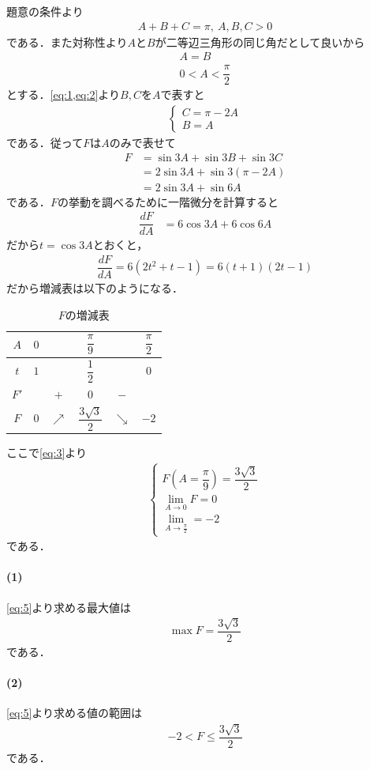 \documentclass[../../main.tex]{subfiles}
\begin{document}
題意の条件より
\begin{align}
  A+B+C=\pi,\ A,B,C>0 \label{eq:1}
\end{align}
である．また対称性より$A$と$B$が二等辺三角形の同じ角だとして良いから
\begin{align}
  A=B \label{eq:2} \\
  0<A<\dfrac{\pi}{2}
\end{align}
とする．\cref{eq:1,eq:2}より$B,C$を$A$で表すと
\begin{align}
  \begin{cases}
    C = \pi -2A \\
    B = A
  \end{cases}
\end{align}
である．従って$F$は$A$のみで表せて
\begin{align}
  F
  &=\sin3A+\sin3B+\sin3C \\
  &=2\sin3A+\sin 3(\pi-2A) \\
  &=2\sin3A+\sin6A \label{eq:3}
\end{align}
である．$F$の挙動を調べるために一階微分を計算すると
\begin{align}
  \dfrac{dF}{dA}&=6\cos3A+6\cos6A \label{eq:4}
\end{align}
だから$t=\cos3A$とおくと，
\begin{align}
  \dfrac{dF}{dA} = 6\left(2t^2+t-1\right) = 6(t+1)(2t-1)
\end{align}
だから増減表は以下のようになる．

\begin{table}[htb]
  \begin{center}
    \caption{$F$の増減表}
    \begin{tabular}{c|ccccc}
      $A$ & $0$ & & $\dfrac{\pi}{9}$ & & $\dfrac{\pi}{2}$ \\
      \hline
      $t$ & $1$ & & $\dfrac{1}{2}$ & & $0$ \\
      \hline
      $F'$ & & $+$ & $0$ & $-$ & \\
      \hline
      $F$ & $0$ & $\nearrow$ & $\dfrac{3\sqrt{3}}{2}$ & $\searrow$ & $-2$
    \end{tabular}
  \end{center}
\end{table}

ここで\cref{eq:3}より
\begin{align}
  \begin{cases}
    F\left(A=\dfrac{\pi}{9}\right) = \dfrac{3\sqrt{3}}{2} \\
    \lim_{A\to 0} F = 0 \\
    \lim_{A\to \frac{\pi}{2}} = -2
  \end{cases} \label{eq:5}
\end{align}
である．

\paragraph{(1)}
\cref{eq:5}より求める最大値は
\begin{align}
  \max F = \dfrac{3\sqrt{3}}{2}
\end{align}
である．

\paragraph{(2)}
\cref{eq:5}より求める値の範囲は
\begin{align}
  -2 <F\le\dfrac{3\sqrt{3}}{2}
\end{align}
である．

\newpage
\end{document}
